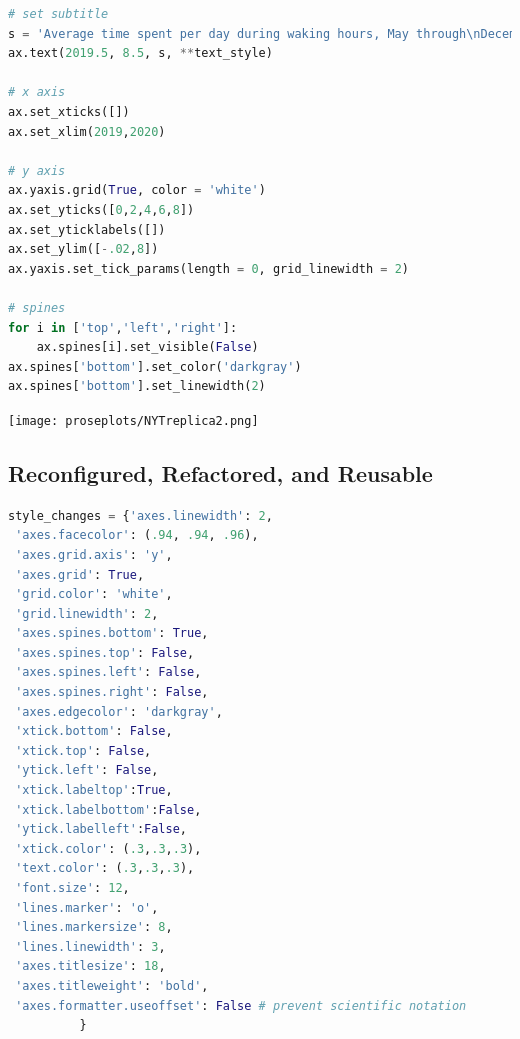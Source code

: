 \begin{lstlisting}[language = Python]
# set subtitle
s = 'Average time spent per day during waking hours, May through\nDecember in 2020 vs. 2019'
ax.text(2019.5, 8.5, s, **text_style)

# x axis
ax.set_xticks([])
ax.set_xlim(2019,2020)

# y axis
ax.yaxis.grid(True, color = 'white')
ax.set_yticks([0,2,4,6,8])
ax.set_yticklabels([])
ax.set_ylim([-.02,8])
ax.yaxis.set_tick_params(length = 0, grid_linewidth = 2)

# spines
for i in ['top','left','right']:
    ax.spines[i].set_visible(False)
ax.spines['bottom'].set_color('darkgray')
ax.spines['bottom'].set_linewidth(2)
\end{lstlisting}


\begin{center}
    \texttt{[image: proseplots/NYTreplica2.png]}
\end{center}

\subsection{Reconfigured, Refactored, and Reusable}\label{subsec:rrr}

\begin{lstlisting}[language = Python]
style_changes = {'axes.linewidth': 2,
 'axes.facecolor': (.94, .94, .96),
 'axes.grid.axis': 'y',
 'axes.grid': True,
 'grid.color': 'white',
 'grid.linewidth': 2,
 'axes.spines.bottom': True,
 'axes.spines.top': False,
 'axes.spines.left': False,
 'axes.spines.right': False,
 'axes.edgecolor': 'darkgray',
 'xtick.bottom': False,
 'xtick.top': False,
 'ytick.left': False,
 'xtick.labeltop':True,
 'xtick.labelbottom':False,
 'ytick.labelleft':False,
 'xtick.color': (.3,.3,.3),
 'text.color': (.3,.3,.3),
 'font.size': 12,
 'lines.marker': 'o',
 'lines.markersize': 8,
 'lines.linewidth': 3,
 'axes.titlesize': 18,
 'axes.titleweight': 'bold', 
 'axes.formatter.useoffset': False # prevent scientific notation
          }
\end{lstlisting}


